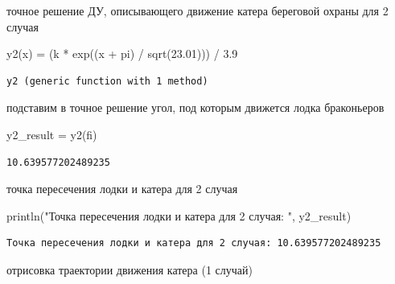 \documentclass[
  12pt,
  a4paper,
  DIV=11,
  numbers=noendperiod]{scrreprt}
\newenvironment{Shaded}{\begin{snugshade}}{\end{snugshade}}
\newcommand{\ConstantTok}[1]{\textcolor[rgb]{0.56,0.35,0.01}{#1}}
\newcommand{\FloatTok}[1]{\textcolor[rgb]{0.68,0.00,0.00}{#1}}
\newcommand{\FunctionTok}[1]{\textcolor[rgb]{0.28,0.35,0.67}{#1}}
\newcommand{\NormalTok}[1]{\textcolor[rgb]{0.00,0.23,0.31}{#1}}
\newcommand{\OperatorTok}[1]{\textcolor[rgb]{0.37,0.37,0.37}{#1}}
\newcommand{\StringTok}[1]{\textcolor[rgb]{0.13,0.47,0.30}{#1}}
\begin{document}
точное решение ДУ, описывающего движение катера береговой охраны для 2
случая

\begin{Shaded}
\begin{Highlighting}[]
\FunctionTok{y2}\NormalTok{(x) }\OperatorTok{=}\NormalTok{ (k }\OperatorTok{*} \FunctionTok{exp}\NormalTok{((x }\OperatorTok{+} \ConstantTok{pi}\NormalTok{) }\OperatorTok{/} \FunctionTok{sqrt}\NormalTok{(}\FloatTok{23.01}\NormalTok{))) }\OperatorTok{/} \FloatTok{3.9}
\end{Highlighting}
\end{Shaded}

\begin{verbatim}
y2 (generic function with 1 method)
\end{verbatim}

подставим в точное решение угол, под которым движется лодка браконьеров

\begin{Shaded}
\begin{Highlighting}[]
\NormalTok{y2\_result }\OperatorTok{=} \FunctionTok{y2}\NormalTok{(fi)}
\end{Highlighting}
\end{Shaded}

\begin{verbatim}
10.639577202489235
\end{verbatim}

точка пересечения лодки и катера для 2 случая

\begin{Shaded}
\begin{Highlighting}[]
\FunctionTok{println}\NormalTok{(}\StringTok{"Точка пересечения лодки и катера для 2 случая: "}\NormalTok{, y2\_result)}
\end{Highlighting}
\end{Shaded}

\begin{verbatim}
Точка пересечения лодки и катера для 2 случая: 10.639577202489235
\end{verbatim}

отрисовка траектории движения катера (1 случай)
\end{document}
